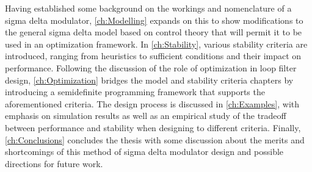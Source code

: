 Having established some background on the workings and nomenclature of a sigma delta modulator, \autoref{ch:Modelling} expands on this to show modifications to the general sigma delta model based on control theory that will permit it to be used in an optimization framework. In \autoref{ch:Stability}, various stability criteria are introduced, ranging from heuristics to sufficient conditions and their impact on performance. Following the discussion of the role of optimization in loop filter design, \autoref{ch:Optimization} bridges the model and stability criteria chapters by introducing a semidefinite programming framework that supports the aforementioned criteria. The design process is discussed in \autoref{ch:Examples}, with emphasis on simulation results as well as an empirical study of the tradeoff between performance and stability when designing to different criteria. Finally, \autoref{ch:Conclusions} concludes the thesis with some discussion about the merits and shortcomings of this method of sigma delta modulator design and possible directions for future work.

\endinput

Any text after an \endinput is ignored.
You could put scraps here or things in progress.
